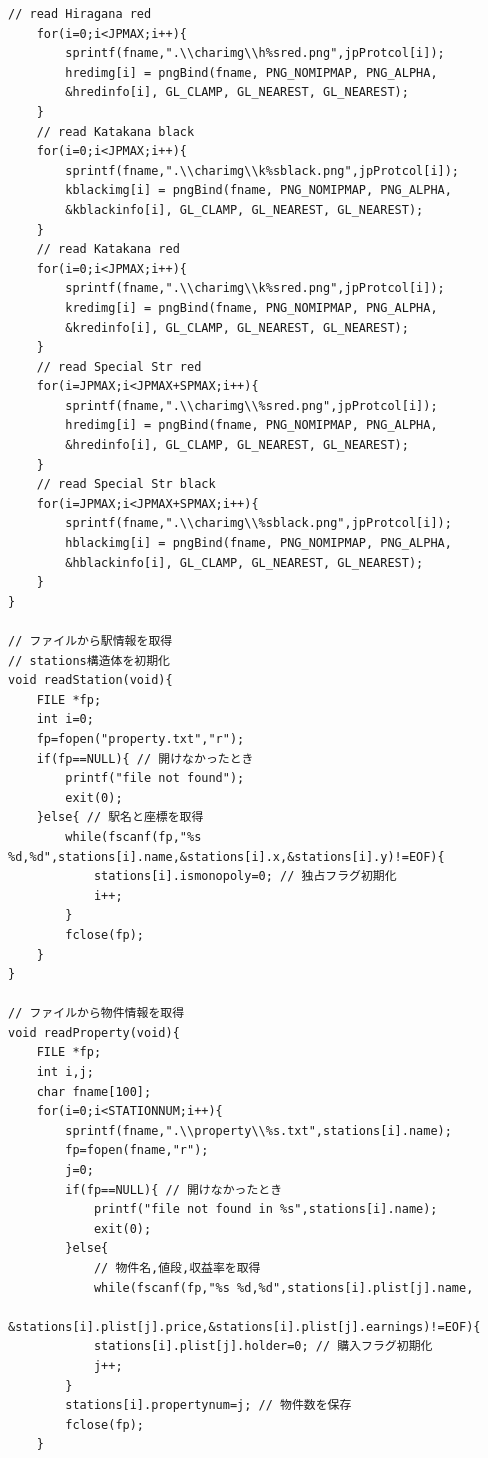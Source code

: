 \documentclass[a4j]{jarticle}
\begin{document}
\begin{lstlisting}[basicstyle=\ttfamily\footnotesize, frame=single,label=code2,caption=game.c]
    // read Hiragana red
    for(i=0;i<JPMAX;i++){
        sprintf(fname,".\\charimg\\h%sred.png",jpProtcol[i]);
        hredimg[i] = pngBind(fname, PNG_NOMIPMAP, PNG_ALPHA, 
        &hredinfo[i], GL_CLAMP, GL_NEAREST, GL_NEAREST);
    }
    // read Katakana black
    for(i=0;i<JPMAX;i++){
        sprintf(fname,".\\charimg\\k%sblack.png",jpProtcol[i]);
        kblackimg[i] = pngBind(fname, PNG_NOMIPMAP, PNG_ALPHA, 
        &kblackinfo[i], GL_CLAMP, GL_NEAREST, GL_NEAREST);
    }
    // read Katakana red
    for(i=0;i<JPMAX;i++){
        sprintf(fname,".\\charimg\\k%sred.png",jpProtcol[i]);
        kredimg[i] = pngBind(fname, PNG_NOMIPMAP, PNG_ALPHA, 
        &kredinfo[i], GL_CLAMP, GL_NEAREST, GL_NEAREST);
    }
    // read Special Str red
    for(i=JPMAX;i<JPMAX+SPMAX;i++){
        sprintf(fname,".\\charimg\\%sred.png",jpProtcol[i]);
        hredimg[i] = pngBind(fname, PNG_NOMIPMAP, PNG_ALPHA, 
        &hredinfo[i], GL_CLAMP, GL_NEAREST, GL_NEAREST);
    }
    // read Special Str black
    for(i=JPMAX;i<JPMAX+SPMAX;i++){
        sprintf(fname,".\\charimg\\%sblack.png",jpProtcol[i]);
        hblackimg[i] = pngBind(fname, PNG_NOMIPMAP, PNG_ALPHA, 
        &hblackinfo[i], GL_CLAMP, GL_NEAREST, GL_NEAREST);
    }
}

// ファイルから駅情報を取得
// stations構造体を初期化
void readStation(void){
    FILE *fp;
    int i=0;
    fp=fopen("property.txt","r");
    if(fp==NULL){ // 開けなかったとき
        printf("file not found");
        exit(0);
    }else{ // 駅名と座標を取得
        while(fscanf(fp,"%s %d,%d",stations[i].name,&stations[i].x,&stations[i].y)!=EOF){
            stations[i].ismonopoly=0; // 独占フラグ初期化
            i++;
        }
        fclose(fp);
    }
}

// ファイルから物件情報を取得
void readProperty(void){
    FILE *fp;
    int i,j;
    char fname[100];
    for(i=0;i<STATIONNUM;i++){
        sprintf(fname,".\\property\\%s.txt",stations[i].name);
        fp=fopen(fname,"r");
        j=0;
        if(fp==NULL){ // 開けなかったとき
            printf("file not found in %s",stations[i].name);
            exit(0);
        }else{
            // 物件名,値段,収益率を取得
            while(fscanf(fp,"%s %d,%d",stations[i].plist[j].name,
            &stations[i].plist[j].price,&stations[i].plist[j].earnings)!=EOF){
            stations[i].plist[j].holder=0; // 購入フラグ初期化
            j++;
        }
        stations[i].propertynum=j; // 物件数を保存
        fclose(fp);
    }


\end{lstlisting}
\end{document}
